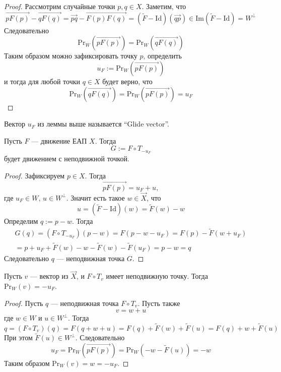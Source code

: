 \documentclass[12pt,a4paper]{article}
\newcommand{\Id}{\ensuremath{\mathrm{Id}}\xspace}
\newcommand{\Img}{\ensuremath{\mathrm{Im}}\xspace}
\renewcommand{\Pr}{\ensuremath{\mathrm{Pr}}\xspace}
\begin{document}
    \begin{proof}
        Рассмотрим случайные точки $p, q \in X$. Заметим, что
        \[
            \overrightarrow{pF(p)} - \overrightarrow{qF(q)}
            = \overrightarrow{pq} - \overrightarrow{F(p)F(q)}
            = (\widetilde{F} - \Id)(\overrightarrow{qp})
            \in \Img(\widetilde{F} - \Id) = W^\perp
        \]
        Следовательно
        \[\Pr_W(\overrightarrow{pF(p)}) = \Pr_W(\overrightarrow{qF(q)})\]
        Таким образом можно зафиксировать точку $p$, определить
        \[u_F := \Pr_W(\overrightarrow{pF(p)})\]
        и тогда для любой точки $q \in X$ будет верно, что
        \[\Pr_W(\overrightarrow{qF(q)}) = \Pr_W(\overrightarrow{pF(p)}) = u_F\]
    \end{proof}

    \begin{definition}
        Вектор $u_F$ из леммы выше называется ``Glide vector''.
    \end{definition}

    \begin{theorem}[основная]
        Пусть $F$ --- движение ЕАП $X$. Тогда
        \[G := F \circ T_{-u_F}\]
        будет движением с неподвижной точкой.
    \end{theorem}

    \begin{proof}
        Зафиксируем $p \in X$. Тогда
        \[\overrightarrow{p F(p)} = u_F + u,\]
        где $u_F \in W$, $u \in W^\perp$. Значит есть такое $w \in \overrightarrow{X}$, что
        \[u = (\widetilde{F} - \Id)(w) = \widetilde{F}(w) - w\]
        Определим $q := p - w$. Тогда
        \begin{multline*}
            G(q)
            = (F \circ T_{-u_F})(p - w)
            = F(p - w - u_F)
            = F(p) - \widetilde{F}(w + u_F)\\
            = p + u_F + \widetilde{F}(w) - w - \widetilde{F}(w) - \widetilde{F}(u_F)
            = p - w
            = q
        \end{multline*}
        Следовательно $q$ --- неподвижная точка $G$.
    \end{proof}

    \begin{corollary}
        Пусть $v$ --- вектор из $\overrightarrow{X}$, и $F \circ T_v$ имеет неподвижную точку. Тогда $\Pr_W(v) = -u_F$.
    \end{corollary}

    \begin{proof}
        Пусть $q$ --- неподвижная точка $F \circ T_v$. Пусть также
        \[v = w + u\]
        где $w \in W$ и $u \in W^\perp$. Тогда
        \[
            q
            = (F \circ T_v)(q)
            = F(q + w + u)
            = F(q) + \widetilde{F}(w) + \widetilde{F}(u)
            = F(q) + w + \widetilde{F}(u)
        \]
        При этом $\widetilde{F}(u) \in W^\perp$. Следовательно
        \[u_F = \Pr_W(\overrightarrow{p F(p)}) = \Pr_W(-w - \widetilde{F}(u)) = -w\]
        Таким образом $\Pr_W(v) = w = -u_F$.
    \end{proof}
\end{document}
